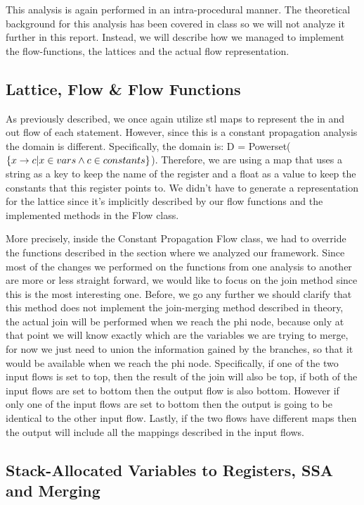 This analysis is again performed in an intra-procedural manner. The theoretical background for this analysis has been covered in class so we will not analyze it further in this report. Instead, we will describe how we managed to implement the flow-functions, the lattices and the actual flow representation. 


\subsection{Lattice, Flow \& Flow Functions}
As previously described, we once again utilize stl maps to represent the in and out flow of each statement. However, since this is a constant propagation analysis the domain is different. Specifically, the domain is: D = Powerset($\{x\rightarrow c|x\in vars \wedge c\in constants\}$). Therefore, we are using a map that uses a string as a key to keep the name of the register and a float as a value to keep the constants that this register points to. We didn't have to generate a representation for the lattice since it's implicitly described by our flow functions and the implemented methods in the Flow class. 

More precisely, inside the Constant Propagation Flow class, we had to override the functions described in the section where we analyzed our framework. Since most of the changes we performed on the functions from one analysis to another are more or less straight forward, we would like to focus on the join method since this is the most interesting one. Before, we go any further we should clarify that this method does not implement the join-merging method described in theory, the actual join will be performed when we reach the phi node, because only at that point we will know exactly which are the variables we are trying to merge, for now we just need to union the information gained by the branches, so that it would be available when we reach the phi node. Specifically, if one of the two input flows is set to top, then the result of the join will also be top, if both of the input flows are set to bottom then the output flow is also bottom. However if only one of the input flows are set to bottom then the output is going to be identical to the other input flow. Lastly, if the two flows have different maps then the output will include all the mappings described in the input flows. 

\subsection*{Stack-Allocated Variables to Registers, SSA and Merging}

